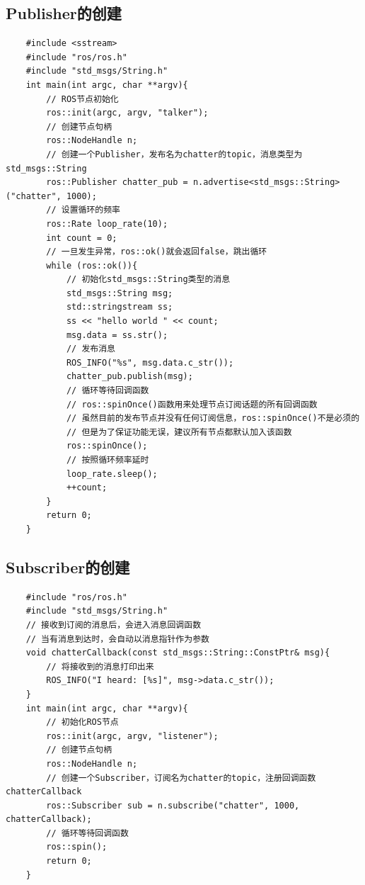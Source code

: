 \documentclass[10pt, oneside]{book}
\begin{document}
\subsection{Publisher的创建}

\begin{verbatim}
    #include <sstream>
    #include "ros/ros.h"
    #include "std_msgs/String.h"
    int main(int argc, char **argv){
        // ROS节点初始化
        ros::init(argc, argv, "talker");
        // 创建节点句柄
        ros::NodeHandle n;
        // 创建一个Publisher，发布名为chatter的topic，消息类型为std_msgs::String
        ros::Publisher chatter_pub = n.advertise<std_msgs::String>("chatter", 1000);
        // 设置循环的频率
        ros::Rate loop_rate(10);
        int count = 0;
        // 一旦发生异常，ros::ok()就会返回false，跳出循环
        while (ros::ok()){
            // 初始化std_msgs::String类型的消息
            std_msgs::String msg;
            std::stringstream ss;
            ss << "hello world " << count;
            msg.data = ss.str();
            // 发布消息
            ROS_INFO("%s", msg.data.c_str());
            chatter_pub.publish(msg);
            // 循环等待回调函数
            // ros::spinOnce()函数用来处理节点订阅话题的所有回调函数
            // 虽然目前的发布节点并没有任何订阅信息，ros::spinOnce()不是必须的
            // 但是为了保证功能无误，建议所有节点都默认加入该函数
            ros::spinOnce();
            // 按照循环频率延时
            loop_rate.sleep();
            ++count;
        }
        return 0;
    }
\end{verbatim}

\subsection{Subscriber的创建}

\begin{verbatim}
    #include "ros/ros.h"
    #include "std_msgs/String.h"
    // 接收到订阅的消息后，会进入消息回调函数
    // 当有消息到达时，会自动以消息指针作为参数
    void chatterCallback(const std_msgs::String::ConstPtr& msg){
        // 将接收到的消息打印出来
        ROS_INFO("I heard: [%s]", msg->data.c_str());
    }
    int main(int argc, char **argv){
        // 初始化ROS节点
        ros::init(argc, argv, "listener");
        // 创建节点句柄
        ros::NodeHandle n;
        // 创建一个Subscriber，订阅名为chatter的topic，注册回调函数chatterCallback
        ros::Subscriber sub = n.subscribe("chatter", 1000, chatterCallback);
        // 循环等待回调函数
        ros::spin();
        return 0;
    }
\end{verbatim}
\end{document}
